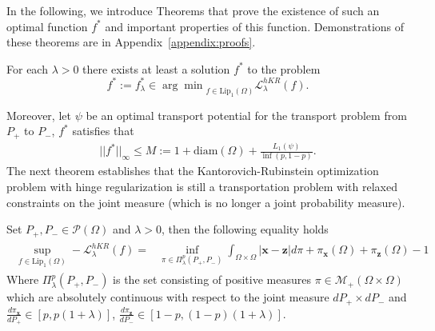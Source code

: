 In the following, we introduce Theorems that prove the existence of such an optimal function $f^*$ and important properties of this function. Demonstrations of these theorems are in Appendix~\ref{appendix:proofs}.
\begin{Theorem} 
\label{Lemma:bounded_M}
 For each $\lambda>0$ there exists at least a solution $f^*$ to the problem  \[ f^*:=f_{\lambda}^*\in{\arg\min}_{f\in \text{Lip}_1(\Omega)}\mathcal{L}^{hKR}_{\lambda}(f) . \]
\end{Theorem}
Moreover, let $\psi$ be an optimal transport potential for the transport problem from $P_+$ to $ P_-$, $f^*$ satisfies that 
\begin{align}\label{eq:M}
	|| f^*||_{\infty}\leq M:= 1+\text{diam}(\Omega)+\frac{L_1(\psi)}{\inf(p,1-p)}.
\end{align}
The next theorem establishes that the Kantorovich-Rubinstein optimization problem with hinge regularization is still a transportation problem with relaxed constraints on the joint measure (which is no longer a joint probability measure).
\begin{Theorem}[Duality]\label{Theo:dual}
Set  $P_+, P_-\in \mathcal{P}(\Omega)$ and $\lambda>0$, then the following equality holds
\begin{align}\label{eq:dual}
\begin{split}
 \sup_{f\in \text{Lip}_1(\Omega)}- \mathcal{L}^{hKR}_\lambda(f)=&	\inf_{\pi \in\Pi^p_{\lambda}(P_+, P_-)}\int_{\Omega\times \Omega}|{\textbf{x}}-{{\textbf{z}}} |d\pi + \pi_{\textbf{x}}(\Omega)+\pi_{{\textbf{z}}}(\Omega)-1
	\end{split}
\end{align}
Where $\Pi^p_{\lambda}(P_+, P_-)$ is the set consisting of positive measures $\pi\in \mathcal{M}_+(\Omega\times \Omega)$ which  are absolutely continuous with respect to the joint measure $dP_+\times dP_-$ and $\frac{d\pi_{\textbf{x}}}{dP_+}\in [p, p(1+\lambda)]$, $\frac{d\pi_{{\textbf{z}}}}{dP_-}\in [1-p, (1-p)(1+\lambda)] $.
\end{Theorem}


